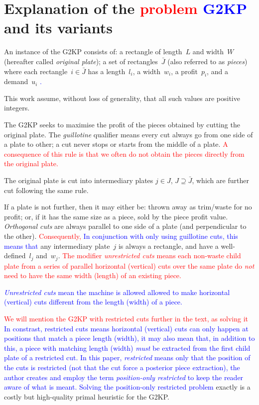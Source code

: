\documentclass[ppgc,tese,english,formais,babel]{iiufrgs}
\newif\iffinalversion
\newcommand{\newtext}[1]{\iffinalversion%
#1%
\else%
\textcolor{blue}{#1}%
\fi%
}
\newcommand{\oldtext}[1]{\iffinalversion%
\else%
\textcolor{red}{#1}%
\fi%
}
\begin{document}
\section{Explanation of the \oldtext{problem}\newtext{G2KP} and its variants}

An instance of the G2KP consists of: a rectangle of length~\(L\) and width~\(W\) (hereafter called \emph{original plate}); a set of rectangles~\(\bar{J}\) (also referred to as \emph{pieces}) where each rectangle~\(i \in \bar{J}\) has a length~\(l_i\), a width~\(w_i\), a profit~\(p_i\), and a demand~\(u_i\)\newtext{.}
This work assume, without loss of generality, that all such values are positive integers.

The G2KP seeks to maximise the profit of the pieces obtained by cutting the original plate.
The \emph{guillotine} qualifier means every cut always go from one side of a plate to other; a cut never stops or starts from the middle of a plate.
\oldtext{A consequence of this rule is that we often do not obtain the pieces directly from the original plate.}
The original plate is cut into intermediary plates \(j \in J\), \(J \supseteq \bar{J}\), which are further cut following the same rule.

If a plate is not further, then it may either be: thrown away as trim/waste for no profit; or, if it has the same size as a piece, sold by the piece profit value.
\emph{Orthogonal cuts} are always parallel to one side of a plate (and perpendicular to the other).
\oldtext{Consequently,}\newtext{In conjunction with only using guillotine cuts, this means that} any intermediary plate~\(j\) is always a rectangle, and have a well-defined~\(l_j\) and~\(w_j\).
\oldtext{The modifier \emph{unrestricted cuts} means each non-waste child plate from a series of parallel horizontal (vertical) cuts over the same plate do \emph{not} need to have the same width (length) of an existing piece.}
\newtext{\emph{Unrestricted cuts} mean the machine is allowed allowed to make horizontal (vertical) cuts different from the length (width) of a piece.}
\oldtext{We will mention the G2KP with restricted cuts further in the text, as solving it}\newtext{In constrast, restricted cuts means horizontal (vertical) cuts can only happen at positions that match a piece length (width), it may also mean that, in addition to this, a piece with matching length (width) \emph{must} be extracted from the first child plate of a restricted cut. In this paper, \emph{restricted} means only that the position of the cuts is restricted (not that the cut force a posterior piece extraction), the author creates and employ the term \emph{position-only restricted} to keep the reader aware of what is meant. Solving the position-only restricted problem} exactly is a costly but high-quality primal heuristic for the G2KP.
\end{document}
